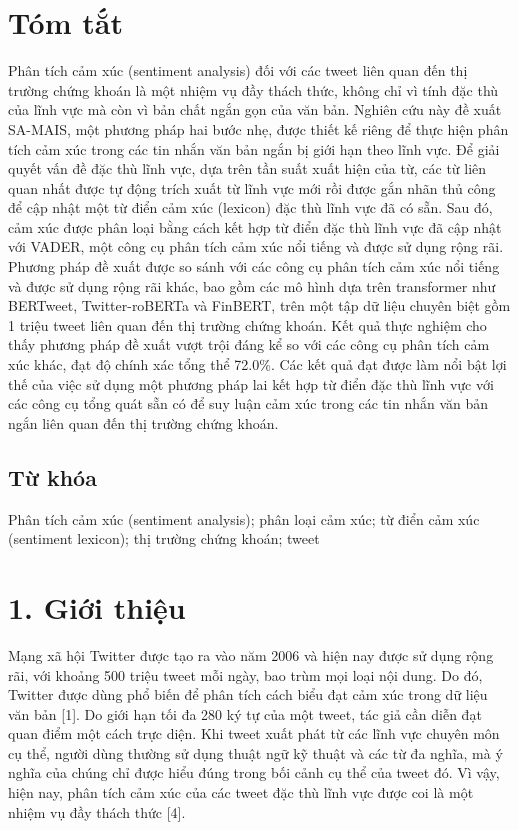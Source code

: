 \section{Tóm tắt}

Phân tích cảm xúc (sentiment analysis) đối với các tweet liên quan đến thị trường chứng khoán là một nhiệm vụ đầy thách thức, không chỉ vì tính đặc thù của lĩnh vực mà còn vì bản chất ngắn gọn của văn bản. Nghiên cứu này đề xuất SA-MAIS, một phương pháp hai bước nhẹ, được thiết kế riêng để thực hiện phân tích cảm xúc trong các tin nhắn văn bản ngắn bị giới hạn theo lĩnh vực. Để giải quyết vấn đề đặc thù lĩnh vực, dựa trên tần suất xuất hiện của từ, các từ liên quan nhất được tự động trích xuất từ lĩnh vực mới rồi được gắn nhãn thủ công để cập nhật một từ điển cảm xúc (lexicon) đặc thù lĩnh vực đã có sẵn. Sau đó, cảm xúc được phân loại bằng cách kết hợp từ điển đặc thù lĩnh vực đã cập nhật với VADER, một công cụ phân tích cảm xúc nổi tiếng và được sử dụng rộng rãi. Phương pháp đề xuất được so sánh với các công cụ phân tích cảm xúc nổi tiếng và được sử dụng rộng rãi khác, bao gồm các mô hình dựa trên transformer như BERTweet, Twitter-roBERTa và FinBERT, trên một tập dữ liệu chuyên biệt gồm 1 triệu tweet liên quan đến thị trường chứng khoán. Kết quả thực nghiệm cho thấy phương pháp đề xuất vượt trội đáng kể so với các công cụ phân tích cảm xúc khác, đạt độ chính xác tổng thể 72.0\%. Các kết quả đạt được làm nổi bật lợi thế của việc sử dụng một phương pháp lai kết hợp từ điển đặc thù lĩnh vực với các công cụ tổng quát sẵn có để suy luận cảm xúc trong các tin nhắn văn bản ngắn liên quan đến thị trường chứng khoán.

\subsection*{Từ khóa}
Phân tích cảm xúc (sentiment analysis); phân loại cảm xúc; từ điển cảm xúc (sentiment lexicon); thị trường chứng khoán; tweet

\section{1. Giới thiệu}

Mạng xã hội Twitter được tạo ra vào năm 2006 và hiện nay được sử dụng rộng rãi, với khoảng 500 triệu tweet mỗi ngày, bao trùm mọi loại nội dung. Do đó, Twitter được dùng phổ biến để phân tích cách biểu đạt cảm xúc trong dữ liệu văn bản [1]. Do giới hạn tối đa 280 ký tự của một tweet, tác giả cần diễn đạt quan điểm một cách trực diện. Khi tweet xuất phát từ các lĩnh vực chuyên môn cụ thể, người dùng thường sử dụng thuật ngữ kỹ thuật và các từ đa nghĩa, mà ý nghĩa của chúng chỉ được hiểu đúng trong bối cảnh cụ thể của tweet đó. Vì vậy, hiện nay, phân tích cảm xúc của các tweet đặc thù lĩnh vực được coi là một nhiệm vụ đầy thách thức [4].

